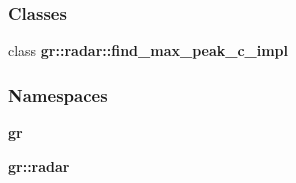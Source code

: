 \subsubsection*{Classes}
\begin{DoxyCompactItemize}
\item 
class {\bf gr\+::radar\+::find\+\_\+max\+\_\+peak\+\_\+c\+\_\+impl}
\end{DoxyCompactItemize}
\subsubsection*{Namespaces}
\begin{DoxyCompactItemize}
\item 
 {\bf gr}
\item 
 {\bf gr\+::radar}
\end{DoxyCompactItemize}
